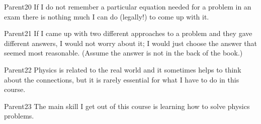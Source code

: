 \begin{question}{Parent20}
    \QuestionIndicative
    If I do not remember a particular equation needed for a problem in
        an exam there is nothing much I can do (legally!) to come up with it.
    \begin{choiceshoriz}[o]
    \end{choiceshoriz}
\end{question}

\begin{question}{Parent21}
    \QuestionIndicative
    If I came up with two different approaches to a problem and they gave
        different answers, I would not worry about it; I would just choose
        the answer that seemed most reasonable. 
    (Assume the answer is not in the back of the book.)
    \begin{choiceshoriz}[o]
    \end{choiceshoriz}
\end{question}

\begin{question}{Parent22}
    \QuestionIndicative
    Physics is related to the real world and it sometimes helps to think
        about the connections, but it is rarely essential for what I have
        to do in this course.
    \begin{choiceshoriz}[o]
    \end{choiceshoriz}
\end{question}

\begin{question}{Parent23}
    \QuestionIndicative
    The main skill I get out of this course is learning how to solve
        physics problems.
    \begin{choiceshoriz}[o]
    \end{choiceshoriz}
\end{question}

